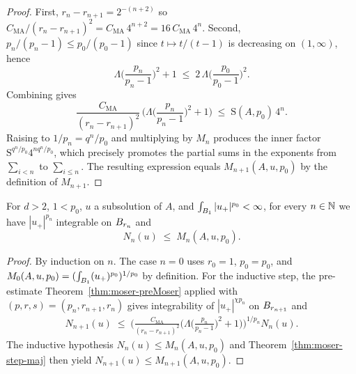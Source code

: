 \begin{proof}
\leanok
{}

First, $r_n - r_{n+1} = 2^{-(n+2)}$ so
$C_{\mathrm{MA}}/(r_n-r_{n+1})^2 = C_{\mathrm{MA}}\,4^{n+2} = 16\,C_{\mathrm{MA}}\,4^{n}$.
Second, $p_n/(p_n-1) \leq p_0/(p_0-1)$ since $t \mapsto t/(t-1)$ is decreasing
on $(1,\infty)$, hence
\begin{equation*}
  \Lambda\Big(\frac{p_n}{p_n-1}\Big)^{2}+1
  \;\leq\; 2\,\Lambda\Big(\frac{p_0}{p_0-1}\Big)^{2}.
\end{equation*}
Combining gives
\begin{equation*}
  \frac{C_{\mathrm{MA}}}{(r_n-r_{n+1})^{2}}\,
    \Big(\Lambda\Big(\frac{p_n}{p_n-1}\Big)^{2}+1\Big)
  \;\leq\;
  \mathrm{S}(A,p_0)\,4^{n}.
\end{equation*}
Raising to $1/p_n = q^n/p_0$ and multiplying by $M_n$ produces the inner factor
$\mathrm{S}^{q^n/p_0} 4^{n q^n/p_0}$, which precisely promotes the partial sums
in the exponents from $\sum_{i<n}$ to $\sum_{i\leq n}$. The resulting expression
equals $M_{n+1}(A,u,p_0)$ by the definition of $M_{n+1}$.
\end{proof}

\begin{theorem}
\label{thm:moser-iter-bound}
\leanok
{}
For $d > 2$, $1 < p_0$, $u$ a subsolution of $A$, and
$\int_{B_{1}} |u_+|^{p_0} < \infty$, for every $n \in \mathbb{N}$ we have
$|u_+|^{p_n}$ integrable on $B_{r_n}$ and
\begin{equation*}
  N_n(u) \;\leq\; M_n(A,u,p_0).
\end{equation*}
\end{theorem}

\begin{proof}
\leanok
{}

By induction on $n$. The case $n=0$ uses $r_0=1$, $p_0 = p_0$, and
$M_0(A,u,p_0)= (\int_{B_{1}} (u_+)^{p_0})^{1/p_0}$ by definition. For the
inductive step, the pre-estimate Theorem~\ref{thm:moser-preMoser} applied with
$(p,r,s) = (p_n,r_{n+1},r_n)$ gives integrability of $|u_+|^{\chi p_n}$ on
$B_{r_{n+1}}$ and
\begin{multline*}
  N_{n+1}(u)
  \;\leq\;
  \Big(\frac{C_{\mathrm{MA}}}{(r_n-r_{n+1})^{2}}
    \Big(\Lambda\Big(\frac{p_n}{p_n-1}\Big)^{2}+1\Big)\Big)^{1/p_n}
  N_n(u).
\end{multline*}
The inductive hypothesis $N_n(u) \leq M_n(A,u,p_0)$ and
Theorem~\ref{thm:moser-step-maj} then yield $N_{n+1}(u) \leq M_{n+1}(A,u,p_0)$.
\end{proof}

